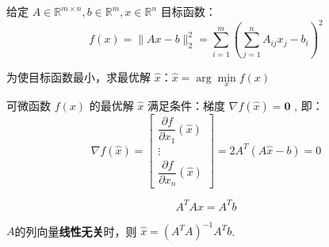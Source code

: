 给定 $ A \in \mathbb{R}^{m \times n}, b \in \mathbb{R}^{m}, x \in \mathbb{R}^{n} $ 目标函数：
\begin{equation}
f(x)=\|A x-b\|_{2}^{2}=\sum_{i=1}^{m}\left(\sum_{j=1}^{n} A_{i j} x_{j}-b_{i}\right)^{2}
\end{equation}

为使目标函数最小，求最优解 $ \hat{x}：\hat{x}=\arg \underset{x}{\min} f(x) $

\begin{theorem}
    可微函数 $ f(x) $ 的最优解 $ \hat{x} $ 满足条件：梯度 $ \nabla f(\hat{x})=\mathbf{0} $ , 即：
\begin{equation}
\nabla f(\hat{x})=\left[\begin{array}{c}
\dfrac{\partial f}{\partial x_{1}}(\hat{x}) \\
\vdots \\
\dfrac{\partial f}{\partial x_{n}}(\hat{x})
\end{array}\right]=2 A^{T}(A \hat{x}-b)=0
\end{equation}
\end{theorem}

\begin{theorem}[正规方程与最小二乘解]
    \begin{equation} A^{T} A x=A^{T} b \end{equation}

    $A$的列向量\textbf{线性无关}时，则 $ \hat{x}=\left(A^{T} A\right)^{-1} A^{T} b $. 
\end{theorem}

